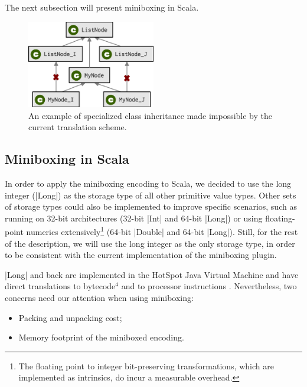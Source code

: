 The next subsection will present miniboxing in Scala.

\begin{figure}[t!]
    \centering
    \includegraphics[width=0.50\textwidth]{diags/spec-multi.eps}

    \caption[Specialization inheritance diagram]{An example of specialized class inheritance made impossible by the current translation scheme.}
    \label{mbox:fig-spec-multi}

\end{figure}

\subsection{Miniboxing in Scala}

In order to apply the miniboxing encoding to Scala, we decided to use the long integer (|Long|) as the storage type of all other primitive value types. Other sets of storage types could also be implemented to improve specific scenarios, such as running on 32-bit architectures (32-bit |Int| and 64-bit |Long|) or using floating-point numerics extensively\footnote{The floating point to integer bit-preserving transformations, which are implemented as intrinsics, do incur a measurable overhead.} (64-bit |Double| and 64-bit |Long|). Still, for the rest of the description, we will use the long integer as the only storage type, in order to be consistent with the current implementation of the miniboxing plugin.

 |Long| and back are implemented in the HotSpot Java Virtual Machine and have direct translations to bytecode$^\text{4}$ and to processor instructions \cite{intel-ia-32-instruction-reference}. Nevertheless, two concerns need our attention when using miniboxing: %
\begin{itemize}
\item Packing and unpacking cost;
\item Memory footprint of the miniboxed encoding.
\end{itemize}

